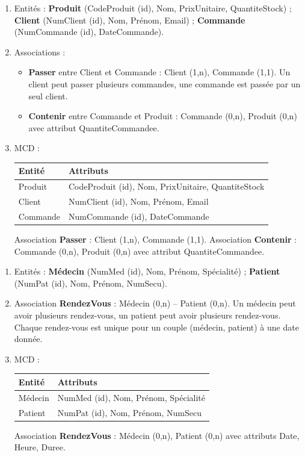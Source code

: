 \begin{enumerate}
    \item Entités : \textbf{Produit} (CodeProduit (id), Nom, PrixUnitaire, QuantiteStock) ; \textbf{Client} (NumClient (id), Nom, Prénom, Email) ; \textbf{Commande} (NumCommande (id), DateCommande).
    \item Associations :
    \begin{itemize}
        \item \textbf{Passer} entre Client et Commande : Client (1,n), Commande (1,1). Un client peut passer plusieurs commandes, une commande est passée par un seul client.
        \item \textbf{Contenir} entre Commande et Produit : Commande (0,n), Produit (0,n) avec attribut QuantiteCommandee.
    \end{itemize}
    \item MCD :
    \begin{center}
    \begin{tabular}{|l|l|}
    \hline
    \textbf{Entité} & \textbf{Attributs} \\
    \hline
    Produit & CodeProduit (id), Nom, PrixUnitaire, QuantiteStock \\
    \hline
    Client & NumClient (id), Nom, Prénom, Email \\
    \hline
    Commande & NumCommande (id), DateCommande \\
    \hline
    \end{tabular}
    \end{center}
    Association \textbf{Passer} : Client (1,n), Commande (1,1).
    Association \textbf{Contenir} : Commande (0,n), Produit (0,n) avec attribut QuantiteCommandee.
\end{enumerate}

\begin{enumerate}
    \item Entités : \textbf{Médecin} (NumMed (id), Nom, Prénom, Spécialité) ; \textbf{Patient} (NumPat (id), Nom, Prénom, NumSecu).
    \item Association \textbf{RendezVous} : Médecin (0,n) -- Patient (0,n). Un médecin peut avoir plusieurs rendez-vous, un patient peut avoir plusieurs rendez-vous. Chaque rendez-vous est unique pour un couple (médecin, patient) à une date donnée.
    \item MCD :
    \begin{center}
    \begin{tabular}{|l|l|}
    \hline
    \textbf{Entité} & \textbf{Attributs} \\
    \hline
    Médecin & NumMed (id), Nom, Prénom, Spécialité \\
    \hline
    Patient & NumPat (id), Nom, Prénom, NumSecu \\
    \hline
    \end{tabular}
    \end{center}
    Association \textbf{RendezVous} : Médecin (0,n), Patient (0,n) avec attributs Date, Heure, Duree.
\end{enumerate}

